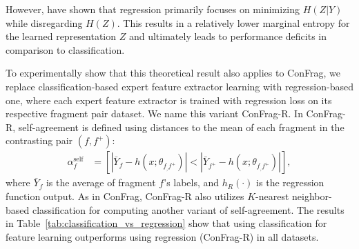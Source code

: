 \documentclass{article}
\theoremstyle{plain}
\theoremstyle{definition}
\theoremstyle{remark}
\begin{document}
However, \citet{zhang2023} have shown that regression primarily focuses on minimizing \(H(Z | Y)\) while disregarding \(H(Z)\). 
This results in a relatively lower marginal entropy for the learned representation \(Z\) and ultimately leads to performance deficits in comparison to classification.

To experimentally show that this theoretical result also applies to ConFrag, we replace classification-based expert feature extractor learning with regression-based one, where each expert feature extractor is trained with regression loss on its respective fragment pair dataset.
We name this variant ConFrag-R.
In ConFrag-R, self-agreement is defined using distances to the mean of each fragment in the contrasting pair $(f, f^+)$:
\begin{align}\label{eq:nar}
\alpha^\text{self}_f &= \left[ |\bar{Y}_f - h(x; \theta_{f_,f^+})| < |\bar{Y}_{f^+} - h(x; \theta_{f_,f^+})| \right],
\end{align}
where $\bar{Y}_f$ is the average of fragment $f$'s labels, and $h_{R}(\cdot)$ is the regression function output.
As in ConFrag, ConFrag-R also utilizes $K$-nearest neighbor-based classification for computing another variant of self-agreement. %
The results in Table~\ref{tab:classification_vs_regression} show that using classification for feature learning outperforms using regression (ConFrag-R) in all datasets.
\end{document}
